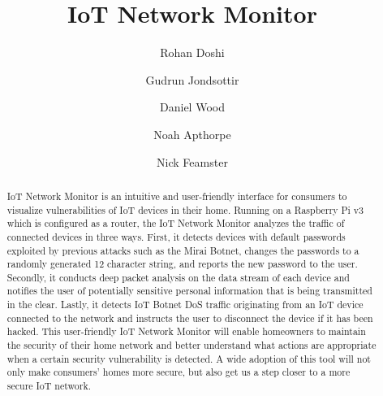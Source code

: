 \documentclass[sigconf]{acmart}
\begin{document}
\title{IoT Network Monitor} 
\author{Rohan Doshi}
\author{Gudrun Jondsottir}
\author{Daniel Wood}
\author{Noah Apthorpe}
\author{Nick Feamster}

\begin{abstract}
IoT Network Monitor is an intuitive and user-friendly interface for consumers to visualize vulnerabilities of IoT devices in their home. Running on a Raspberry Pi v3 which is configured as a router, the IoT Network Monitor analyzes the traffic of connected devices in three ways. First, it detects devices with default passwords exploited by previous attacks such as the Mirai Botnet, changes the passwords to a randomly generated 12 character string, and reports the new password to the user. Secondly, it conducts deep packet analysis on the data stream of each device and notifies the user of potentially sensitive personal information that is being transmitted in the clear. Lastly, it detects IoT Botnet DoS traffic originating from an IoT device connected to the network and instructs the user to disconnect the device if it has been hacked. This user-friendly IoT Network Monitor will enable homeowners to maintain the security of their home network and better understand what actions are appropriate when a certain security vulnerability is detected. A wide adoption of this tool will not only make consumers' homes more secure, but also get us a step closer to a more secure IoT network.
\end{abstract}


\maketitle




\end{document}

